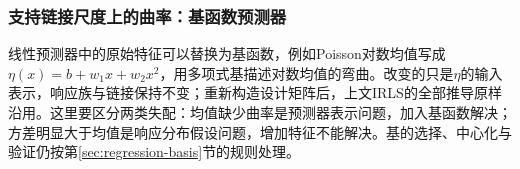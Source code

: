 \subsubsection{支持链接尺度上的曲率：基函数预测器}
\label{sec:regression-glm-basis}

线性预测器中的原始特征可以替换为基函数，例如Poisson对数均值写成$\eta(x)=b+w_1x+w_2x^2$，用多项式基描述对数均值的弯曲。改变的只是$\eta$的输入表示，响应族与链接保持不变；重新构造设计矩阵后，上文IRLS的全部推导原样沿用。这里要区分两类失配：均值缺少曲率是预测器表示问题，加入基函数解决；方差明显大于均值是响应分布假设问题，增加特征不能解决。基的选择、中心化与验证仍按第\ref{sec:regression-basis}节的规则处理。
